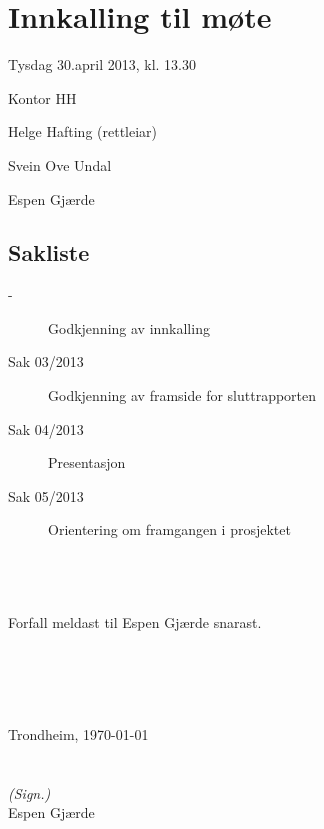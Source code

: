 \documentclass[norsk,12pt,a4paper]{article}
\begin{document}
\thispagestyle{empty}
\section*{Innkalling til møte}
\begin{description} \itemsep1pt
	\item[Tid] Tysdag 30.april 2013, kl. 13.30
	\item[Stad] Kontor HH
	\item[Til]
	\begin{description}\itemsep1pt
		\item Helge Hafting (rettleiar)
		\item Svein Ove Undal
		\item Espen Gjærde
	\end{description}
\end{description}

\subsection*{Sakliste}
\begin{description}
	\item[-] Godkjenning av innkalling
	\item[Sak 03/2013] Godkjenning av framside for sluttrapporten
	\item[Sak 04/2013] Presentasjon
	\item[Sak 05/2013] Orientering om framgangen i prosjektet
\end{description}

~ \\ ~ \\ ~ \\
Forfall meldast til Espen Gjærde snarast.

~ \\ ~ \\ ~ \\ ~ \\
Trondheim, \today
~ \\ ~ \\ ~ \\
\emph{(Sign.)} \\ Espen Gjærde
	
\end{document}
